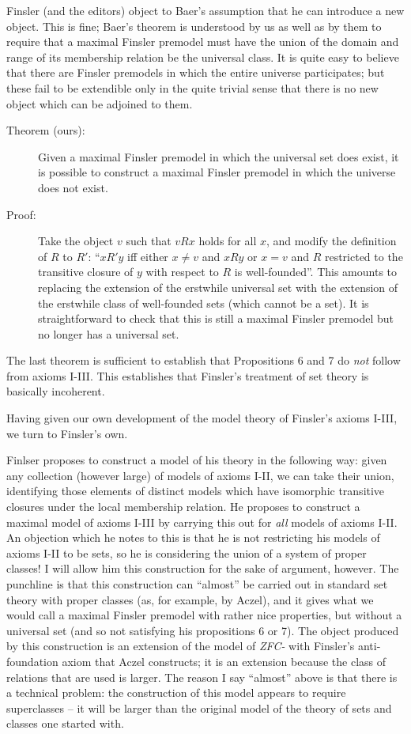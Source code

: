 Finsler (and the editors) object to Baer's assumption that he can
introduce a new object.  This is fine; Baer's theorem is understood by
us as well as by them to require that a maximal Finsler premodel must
have the union of the domain and range of its membership relation be
the universal class.  It is quite easy to believe that there are
Finsler premodels in which the entire universe participates; but these
fail to be extendible only in the quite trivial sense that there is no
new object which can be adjoined to them.
\begin{description}
\item[Theorem (ours):] Given a maximal Finsler premodel in which the
universal set does exist, it is possible to construct a maximal
Finsler premodel in which the universe does not exist.

\item[Proof:] Take the object $v$ such that $v R x$ holds for all $x$,
and modify the definition of $R$ to $R'$: ``$x R' y$ iff either $x
\neq v$ and $x R y$ or $x = v$ and $R$ restricted to the transitive
closure of $y$ with respect to $R$ is well-founded''.  This amounts to
replacing the extension of the erstwhile universal set with the
extension of the erstwhile class of well-founded sets (which cannot be
a set).  It is straightforward to check that this is still a maximal
Finsler premodel but no longer has a universal set.

\end{description}

The last theorem is sufficient to establish that Propositions 6 and 7
do {\em not\/} follow from axioms I-III.  This establishes that
Finsler's treatment of set theory is basically incoherent.

Having given our own development of the model theory of Finsler's
axioms I-III, we turn to Finsler's own.

Finlser proposes to construct a model of his theory in the following
way: given any collection (however large) of models of axioms I-II, we
can take their union, identifying those elements of distinct models
which have isomorphic transitive closures under the local membership
relation.  He proposes to construct a maximal model of axioms I-III by
carrying this out for {\em all\/} models of axioms I-II.  An objection
which he notes to this is that he is not restricting his models of
axioms I-II to be sets, so he is considering the union of a system of
proper classes!  I will allow him this construction for the sake of
argument, however.  The punchline is that this construction can
``almost'' be carried out in standard set theory with proper classes
(as, for example, by Aczel), and it gives what we would call a maximal
Finsler premodel with rather nice properties, but without a universal
set (and so not satisfying his propositions 6 or 7).  The object
produced by this construction is an extension of the model of {\em
ZFC-\/} with Finsler's anti-foundation axiom that Aczel constructs; it
is an extension because the class of relations that are used is larger.
The reason I say ``almost'' above is that there is a technical
problem: the construction of this model appears to require
superclasses -- it will be larger than the original model of the
theory of sets and classes one started with.

